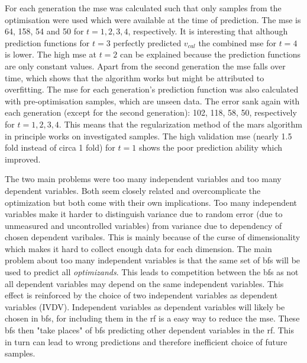 For each generation the \gls{mse} was calculated such that only samples 
from the optimisation were used which were available at the time of prediction. 
The \gls{mse} is 64, 158, 54 and 50 for $t=1,2,3,4$, respectively. 
It is interesting that although prediction functions for $t=3$ perfectly predicted $v_{cal}$ 
the combined \gls{mse} for $t=4$ is lower. 
The high \gls{mse} at $t=2$ can be explained because the prediction functions are only constant values. 
Apart from the second generation the \gls{mse} falls over time, which shows that the algorithm works but might be attributed to overfitting.
The \gls{mse} for each generation's prediction function was also calculated with pre-optimisation samples, which are unseen data. 
The error sank again with each generation (except for the second generation): 102, 118, 58, 50, respectively for $t=1,2,3,4$. 
This means that the regularization method of the \gls{mars} algorithm in principle works on investigated samples. 
The high validation \gls{mse} (nearly 1.5 fold instead of circa 1 fold) for $t=1$ shows the poor prediction ability which improved.

The two main problems were too many independent variables and too many dependent variables. 
Both seem closely related and overcomplicate the optimization but both come with their own implications. 
Too many independent variables make it harder to distinguish variance due to random error (due to unmeasured and uncontrolled variables) from variance due to dependency of chosen dependent varibales. 
This is mainly because of the curse of dimensionality  which makes it hard to collect enough data for each dimension. 
The main problem about too many independent variables is that the same set of \gls{bf}s will be used to predict all \textit{optimizands}.
This leads to competition between the \gls{bf}s as not all dependent variables may depend on the same independent variables. 
This effect is reinforced by the choice of two independent variables as dependent variables (IVDV). 
Independent variables as dependent variables will likely be chosen in \gls{bf}s, 
for including them in the \gls{rf} is a easy way to reduce the \gls{mse}.
These \gls{bf}s then "take places"  of \gls{bf}s predicting other dependent variables in the \gls{rf}. 
This in turn can lead to wrong predictions and therefore inefficient choice of future samples. 


